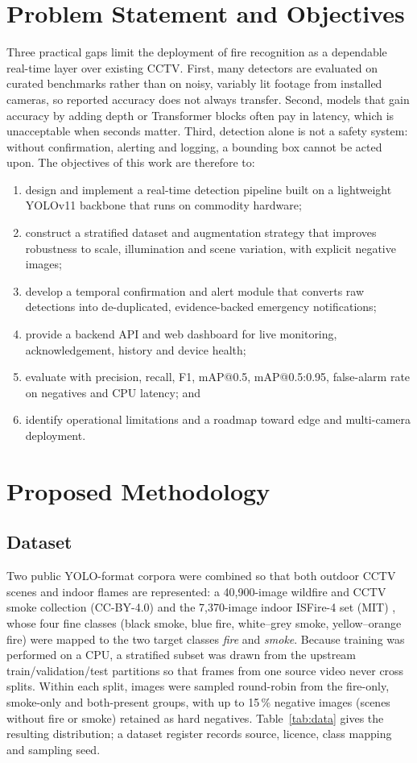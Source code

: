 \documentclass[conference]{IEEEtran}
\begin{document}
\section{Problem Statement and Objectives}\label{sec:problem}
Three practical gaps limit the deployment of fire recognition as a dependable real-time layer over existing CCTV. First, many detectors are evaluated on curated benchmarks rather than on noisy, variably lit footage from installed cameras, so reported accuracy does not always transfer. Second, models that gain accuracy by adding depth or Transformer blocks often pay in latency, which is unacceptable when seconds matter. Third, detection alone is not a safety system: without confirmation, alerting and logging, a bounding box cannot be acted upon. The objectives of this work are therefore to:
\begin{enumerate}
\item design and implement a real-time detection pipeline built on a lightweight YOLOv11 backbone that runs on commodity hardware;
\item construct a stratified dataset and augmentation strategy that improves robustness to scale, illumination and scene variation, with explicit negative images;
\item develop a temporal confirmation and alert module that converts raw detections into de-duplicated, evidence-backed emergency notifications;
\item provide a backend API and web dashboard for live monitoring, acknowledgement, history and device health;
\item evaluate with precision, recall, F1, mAP@0.5, mAP@0.5:0.95, false-alarm rate on negatives and CPU latency; and
\item identify operational limitations and a roadmap toward edge and multi-camera deployment.
\end{enumerate}

\section{Proposed Methodology}\label{sec:method}
\subsection{Dataset}
Two public YOLO-format corpora were combined so that both outdoor CCTV scenes and indoor flames are represented: a 40{,}900-image wildfire and CCTV smoke collection (CC-BY-4.0) \cite{ds_wildfire} and the 7{,}370-image indoor ISFire-4 set (MIT) \cite{ds_isfire}, whose four fine classes (black smoke, blue fire, white--grey smoke, yellow--orange fire) were mapped to the two target classes \textit{fire} and \textit{smoke}. Because training was performed on a CPU, a stratified subset was drawn from the upstream train/validation/test partitions so that frames from one source video never cross splits. Within each split, images were sampled round-robin from the fire-only, smoke-only and both-present groups, with up to 15\,\% negative images (scenes without fire or smoke) retained as hard negatives. Table~\ref{tab:data} gives the resulting distribution; a dataset register records source, licence, class mapping and sampling seed.
\end{document}
